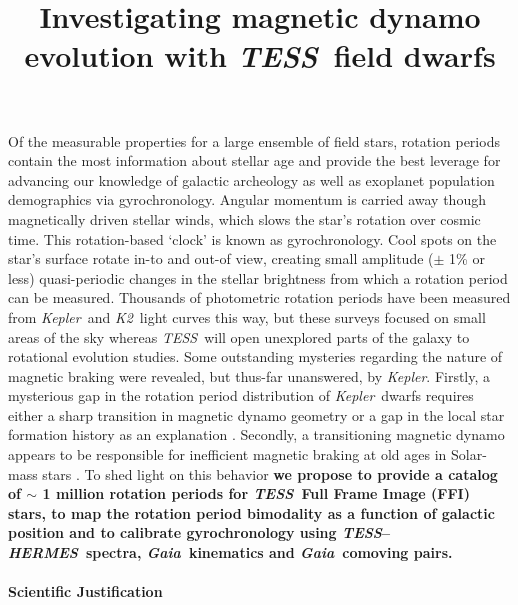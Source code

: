 \documentclass[letterpaper,12pt,preprint]{hack_aastex}
\newcommand{\Kepler}{{\it Kepler}}
\newcommand{\kepler}{\Kepler}
\newcommand{\Ktwo}{{\it K2}}
\newcommand{\ktwo}{\Ktwo}
\newcommand{\TESS}{{\it TESS}}
\newcommand{\tess}{{\it TESS}}
\newcommand{\gaia}{{\it Gaia}}
\newcommand{\hermes}{{\it HERMES}}
\begin{document}
\title{Investigating magnetic dynamo evolution with \TESS\ field dwarfs}

Of the measurable properties for a large ensemble of field stars, rotation
periods contain the most information about stellar age and provide the best
leverage for advancing our knowledge of galactic archeology as well as
exoplanet population demographics via gyrochronology.
Angular momentum is carried away though magnetically driven stellar winds,
which slows the star's rotation over cosmic time.
This rotation-based `clock' is known as gyrochronology.
Cool spots on the star's surface rotate in-to and out-of view, creating small
amplitude ($\pm$ 1\% or less) quasi-periodic changes in the stellar
brightness from which a rotation period can be measured.
Thousands of photometric rotation periods have been measured from \Kepler\ and
\ktwo\ light curves this way, but these surveys focused on small areas of the
sky whereas \tess\ will open unexplored parts of the galaxy to rotational
evolution studies.
Some outstanding mysteries regarding the nature of magnetic braking were
revealed, but thus-far unanswered, by \kepler.
Firstly, a mysterious gap in the rotation period distribution of \Kepler\
dwarfs requires either a sharp transition in magnetic dynamo geometry or a gap
in the local star formation history as an explanation \citep{mcquillan2014,
davenport2017}.
Secondly, a transitioning magnetic dynamo appears to be responsible for
inefficient magnetic braking at old ages in Solar-mass stars
\citep{van-saders2016}.
To shed light on this behavior {\bf we propose to provide a catalog of $\sim$
1 million rotation periods for \TESS\ Full Frame Image (FFI) stars, to map the
rotation period bimodality as a function of galactic position and to calibrate
gyrochronology using \tess--\hermes\ spectra, \gaia\ kinematics and \gaia\
comoving pairs.}

\paragraph{Scientific Justification}
\end{document}
